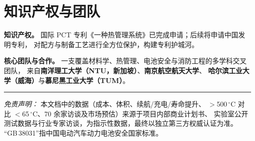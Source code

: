 \documentclass[11pt,a4paper]{ctexart}
\begin{document}
\section{知识产权与团队}
\textbf{知识产权。} 国际 PCT 专利《一种热管理系统》已完成申请；后续将申请中国发明专利，
对配方与制备工艺进行全方位保护，构建专利护城河。

\vspace{4pt}
\noindent\textbf{核心团队与合作。} 一支覆盖材料学、热管理、电池安全与消防工程的多学科交叉团队，
来自\textbf{南洋理工大学（NTU，新加坡）}、\textbf{南京航空航天大学}、
\textbf{哈尔滨工业大学（威海）}与\textbf{慕尼黑工业大学（TUM）}。

\vspace{14pt}
\hrule
\vspace{6pt}
{\footnotesize\color{bsgray}\textit{免责声明：} 本文档中的数据（成本、体积、续航/充电/寿命提升、
$>$500\,$^{\circ}$C 对比 $<$65\,$^{\circ}$C、70 余家访谈及市场预估）来源于项目内部商业计划书、
实验室公开测试数据与行业专家访谈，为指示性数据，最终以独立第三方权威认证为准。
“GB\,38031”指中国电动汽车动力电池安全国家标准。}
\end{document}
